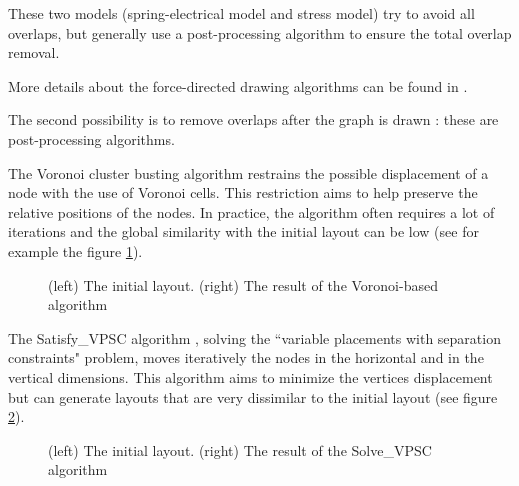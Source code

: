 \documentclass[12pt]{report}
\begin{document}
These two models (spring-electrical model and stress model) try to avoid all overlaps, but generally use a post-processing algorithm to ensure the total overlap removal.

More details about the force-directed drawing algorithms can be found in \cite{Kob13}.

\bigskip
The second possibility is to remove overlaps after the graph is drawn : these are post-processing algorithms.

The Voronoi cluster busting algorithm \cite{Gansner98} restrains the possible displacement of a node with the use of Voronoi cells. This restriction aims to help preserve the relative positions of the nodes. In practice, the algorithm often requires a lot of iterations and the global similarity with the initial layout can be low (see for example the figure \ref{voronoi}).

\begin{figure}[h]
  \setlength\fboxsep{5pt}
  \setlength\fboxrule{0.5pt}
  \caption{(left) The initial layout. (right) The result of the Voronoi-based algorithm}
  \label{voronoi}
\end{figure}

The Satisfy\_VPSC algorithm \cite{VPSC06}, solving the ``variable placements with separation constraints" problem, moves iteratively the nodes in the horizontal and in the vertical dimensions. This algorithm aims to minimize the vertices displacement but can generate layouts that are very dissimilar to the initial layout (see figure \ref{vpsc}).

\begin{figure}[h]
	\center
  \setlength\fboxsep{5pt}
  \setlength\fboxrule{0.5pt}
  \caption{(left) The initial layout. (right) The result of the Solve\_VPSC algorithm}
  \label{vpsc}
\end{figure}
\end{document}

